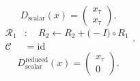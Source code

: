 \[D_{\mathrm{scalar}}(x)=\begin{pmatrix}x_{\tau}\\x_{\tau}\end{pmatrix}.\]
\[\begin{aligned}\mathcal R_{1}&:\quad R_2 \leftarrow R_2+\bigl(-I\bigr)\circ R_1\\\mathcal C&=\mathrm{id}\end{aligned}.\]
\[D_{\mathrm{scalar}}^{\mathrm{reduced}}(x)=\begin{pmatrix}x_{\tau}\\0\end{pmatrix}.\]
